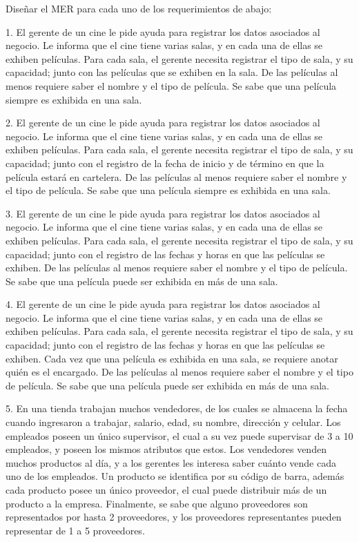 \documentclass[letterpaper]{article}
\begin{document}
Diseñar el MER para cada uno de los requerimientos de abajo:

1. El gerente de un cine le pide ayuda para registrar los datos asociados al negocio. Le informa que el cine tiene varias salas, y en cada una de ellas se exhiben películas. Para cada sala, el gerente necesita registrar el tipo de sala, y su capacidad; junto con las películas que se exhiben en la sala. De las películas al menos requiere saber el nombre y el tipo de película. Se sabe que una película siempre es exhibida en una sala.



2. El gerente de un cine le pide ayuda para registrar los datos asociados al negocio. Le informa que el cine tiene varias salas, y en cada una de ellas se exhiben películas. Para cada sala, el gerente necesita registrar el tipo de sala, y su capacidad; junto con el registro de la fecha de inicio y de término en que la película estará en cartelera. De las películas al menos requiere saber el nombre y el tipo de película. Se sabe que una película siempre es exhibida en una sala.

3. El gerente de un cine le pide ayuda para registrar los datos asociados al negocio. Le informa que el cine tiene varias salas, y en cada una de ellas se exhiben películas. Para cada sala, el gerente necesita registrar el tipo de sala, y su capacidad; junto con el registro de las fechas y horas en que las películas se exhiben. De las películas al menos requiere saber el nombre y el tipo de película. Se sabe que una película puede ser exhibida en más de una sala.

4. El gerente de un cine le pide ayuda para registrar los datos asociados al negocio. Le informa que el cine tiene varias salas, y en cada una de ellas se exhiben películas. Para cada sala, el gerente necesita registrar el tipo de sala, y su capacidad; junto con el registro de las fechas y horas en que las películas se exhiben. Cada vez que una película es exhibida en una sala, se requiere anotar quién es el encargado. De las películas al menos requiere saber el nombre y el tipo de película. Se sabe que una película puede ser exhibida en más de una sala.

5. En una tienda trabajan muchos vendedores, de los cuales se almacena la fecha cuando ingresaron a trabajar, salario, edad, su nombre, dirección y celular. Los empleados poseen un único supervisor, el cual a su vez puede supervisar de 3 a 10 empleados, y poseen los mismos atributos que estos. Los vendedores venden muchos productos al día, y a los gerentes les interesa saber cuánto vende cada uno de los empleados. Un producto se identifica por su código de barra, además cada producto posee un único proveedor, el cual puede distribuir más de un producto a la empresa. Finalmente, se sabe que alguno proveedores son representados por hasta 2 proveedores, y los proveedores representantes pueden representar de 1 a 5 proveedores.
\end{document}
